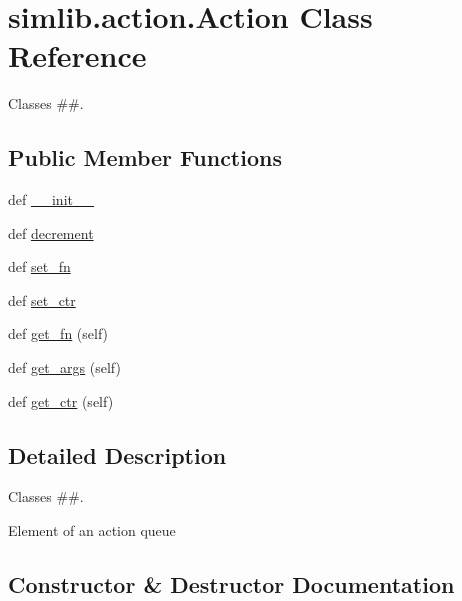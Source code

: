 \hypertarget{classsimlib_1_1action_1_1_action}{}\section{simlib.\+action.\+Action Class Reference}
\label{classsimlib_1_1action_1_1_action}


Classes \#\#.  


\subsection*{Public Member Functions}
\begin{DoxyCompactItemize}
\item 
def \mbox{\hyperlink{classsimlib_1_1action_1_1_action_a9f85fbf1e0a4249eb884a10408e61583}{\+\_\+\+\_\+init\+\_\+\+\_\+}}
\item 
def \mbox{\hyperlink{classsimlib_1_1action_1_1_action_ade5a713fac538d1c6c2db749e45368d4}{decrement}}
\item 
def \mbox{\hyperlink{classsimlib_1_1action_1_1_action_a7208f5d6452283fe610143e5b0786f2b}{set\+\_\+fn}}
\item 
def \mbox{\hyperlink{classsimlib_1_1action_1_1_action_a5043b6debec6f1486a449b0393351353}{set\+\_\+ctr}}
\item 
def \mbox{\hyperlink{classsimlib_1_1action_1_1_action_ab9a687eb0392442ddf3ea24216115eab}{get\+\_\+fn}} (self)
\item 
def \mbox{\hyperlink{classsimlib_1_1action_1_1_action_a50ced713bcfa576f7177455b4b1d6d33}{get\+\_\+args}} (self)
\item 
def \mbox{\hyperlink{classsimlib_1_1action_1_1_action_a9d3d09c4547aa4bb649f1ccc168ebd3b}{get\+\_\+ctr}} (self)
\end{DoxyCompactItemize}


\subsection{Detailed Description}
Classes \#\#. 

\begin{DoxyVerb}Element of an action queue
\end{DoxyVerb}
 

\subsection{Constructor \& Destructor Documentation}
\mbox{\label{classsimlib_1_1action_1_1_action_a9f85fbf1e0a4249eb884a10408e61583}} 
